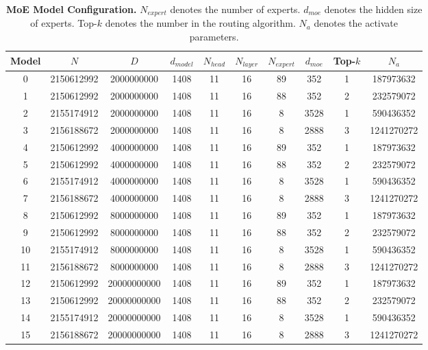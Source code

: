 \documentclass[11pt]{article}
\begin{document}
        \begin{table}
        [h!]
        \centering

\begin{tabular}{cccccccccc}
\toprule
Model & {$N$} & {$D$} & {$d_{{model}}$} & {$N_{{head}}$} & {$N_{{layer}}$} & {$N_{{expert}}$} & {$d_{{moe}}$} & {Top-$k$} & {$N_a$} \\
\midrule
0 & 2150612992 & 2000000000 & 1408 & 11 & 16 & 89 & 352 & 1 & 187973632 \\
1 & 2150612992 & 2000000000 & 1408 & 11 & 16 & 88 & 352 & 2 & 232579072 \\
2 & 2155174912 & 2000000000 & 1408 & 11 & 16 & 8 & 3528 & 1 & 590436352 \\
3 & 2156188672 & 2000000000 & 1408 & 11 & 16 & 8 & 2888 & 3 & 1241270272 \\
4 & 2150612992 & 4000000000 & 1408 & 11 & 16 & 89 & 352 & 1 & 187973632 \\
5 & 2150612992 & 4000000000 & 1408 & 11 & 16 & 88 & 352 & 2 & 232579072 \\
6 & 2155174912 & 4000000000 & 1408 & 11 & 16 & 8 & 3528 & 1 & 590436352 \\
7 & 2156188672 & 4000000000 & 1408 & 11 & 16 & 8 & 2888 & 3 & 1241270272 \\
8 & 2150612992 & 8000000000 & 1408 & 11 & 16 & 89 & 352 & 1 & 187973632 \\
9 & 2150612992 & 8000000000 & 1408 & 11 & 16 & 88 & 352 & 2 & 232579072 \\
10 & 2155174912 & 8000000000 & 1408 & 11 & 16 & 8 & 3528 & 1 & 590436352 \\
11 & 2156188672 & 8000000000 & 1408 & 11 & 16 & 8 & 2888 & 3 & 1241270272 \\
12 & 2150612992 & 20000000000 & 1408 & 11 & 16 & 89 & 352 & 1 & 187973632 \\
13 & 2150612992 & 20000000000 & 1408 & 11 & 16 & 88 & 352 & 2 & 232579072 \\
14 & 2155174912 & 20000000000 & 1408 & 11 & 16 & 8 & 3528 & 1 & 590436352 \\
15 & 2156188672 & 20000000000 & 1408 & 11 & 16 & 8 & 2888 & 3 & 1241270272 \\
\bottomrule
\end{tabular}
        \caption{\textbf{MoE Model Configuration.} {$N_{{expert}}$} denotes the number of experts. {$d_{{moe}}$} denotes the hidden size of experts. 
 {Top-$k$} denotes the number in the routing algorithm. {$N_a$} denotes the activate parameters.} %
        \label{tab:moe_struct}
        \end{table}
\end{document}
